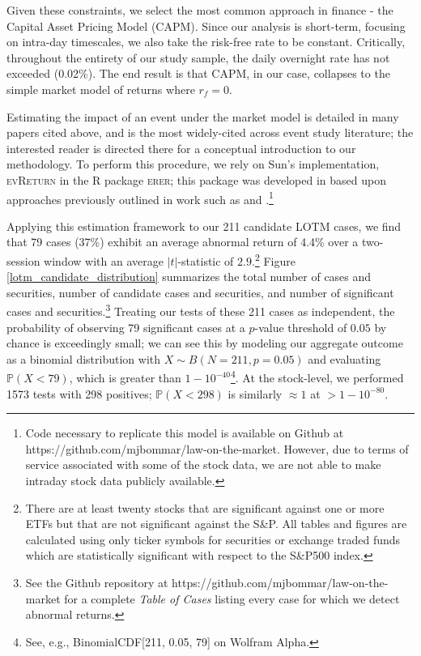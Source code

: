 \documentclass[preprint,12pt]{elsarticle}
\begin{document}
Given these constraints, we select the most common approach in finance - the Capital Asset Pricing Model (CAPM).  Since our analysis is short-term, focusing on intra-day timescales, we also take the risk-free rate to be constant.  Critically, throughout the entirety of our study sample, the daily overnight rate has not exceeded (0.02\%).  The end result is that CAPM, in our case, collapses to the simple market model of returns where $r_f=0$.

Estimating the impact of an event under the market model is detailed in many papers cited above, and \cite{mackinlay1997event} is the most widely-cited across event study literature; the interested reader is directed there for a conceptual introduction to our methodology.  To perform this procedure, we rely on Sun's implementation, \textsc{evReturn} in the R package \textsc{erer}; this package was developed in \cite{sun2011effects} based upon approaches previously outlined in work such as \cite{fama1969adjustment} and \cite{mackinlay1997event}.\footnote{Code necessary to replicate this model is available on Github at https://github.com/mjbommar/law-on-the-market. However, due to terms of service associated with some of the stock data, we are not able to make intraday stock data publicly available.} 

Applying this estimation framework to our 211 candidate LOTM cases, we find that 79 cases (37\%) exhibit an average abnormal return of 4.4\% over a two-session window with an average $|t|$-statistic of $2.9$.\footnote{There are at least twenty stocks that are significant against one or more ETFs but that are not significant against the S\&P.  All tables and figures are calculated using only ticker symbols for securities or exchange traded funds which are statistically significant with respect to the S\&P500 index.} Figure \ref{lotm_candidate_distribution} summarizes the total number of cases and securities, number of candidate cases and securities, and number of significant cases and securities.\footnote{See the Github repository at https://github.com/mjbommar/law-on-the-market for a complete \textit{Table of Cases} listing every case for which we detect abnormal returns.}  Treating our tests of these 211 cases as independent, the probability of observing 79 significant cases at a $p$-value threshold of $0.05$ by chance is exceedingly small; we can see this by modeling our aggregate outcome as a binomial distribution with $X \sim B(N=211, p=0.05)$ and evaluating $\mathbb{P}(X < 79)$, which is greater than $1 - 10^{-40}$\footnote{See, e.g., BinomialCDF[211, 0.05, 79] on Wolfram Alpha.}.  At the stock-level, we performed 1573 tests with 298 positives; $\mathbb{P}(X < 298)$ is similarly $\approx 1$ at $> 1 - 10^{-80}$.
\end{document}
